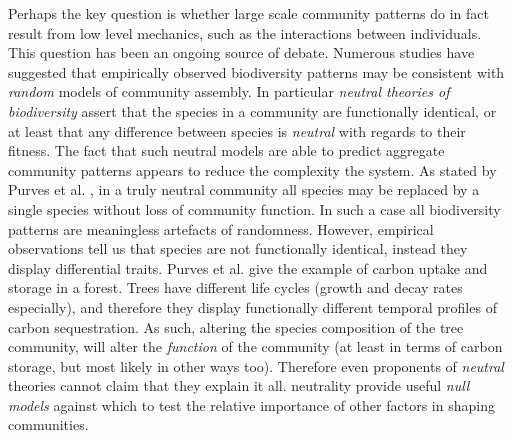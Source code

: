 Perhaps the key question is whether large scale community patterns do in fact result from low level mechanics, such as the interactions between individuals. This question has been an ongoing source of debate. Numerous studies have suggested that empirically observed biodiversity patterns may be consistent with \emph{random} models of community assembly. In particular \emph{neutral theories of biodiversity} \cite{hubbell2001unified,volkov2003neutral} assert that the species in a community are functionally identical, or at least that any difference between species is \emph{neutral} with regards to their fitness. The fact that such neutral models are able to predict aggregate community patterns appears to reduce the complexity the system. As stated by Purves et al. \cite{purves2005ecological}, in a truly neutral community all species may be replaced by a single species without loss of community function. In such a case all biodiversity patterns are meaningless artefacts of randomness. However, empirical observations tell us that species are not functionally identical, instead they display differential traits. Purves et al. give the example of carbon uptake and storage in a forest. Trees have different life cycles (growth and decay rates especially), and therefore they display functionally different temporal profiles of carbon sequestration. As such, altering the species composition of the tree community, will alter the \emph{function} of the community (at least in terms of carbon storage, but most likely in other ways too). Therefore even proponents of \emph{neutral} theories cannot claim that they explain it all.  neutrality  provide useful \emph{null models} against which to test the relative importance of other factors  in shaping communities.   


